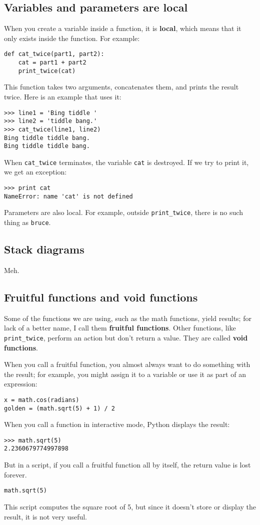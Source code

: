 \documentclass{article}
\begin{document}
\subsection{Variables and parameters are local}
When you create a variable inside a function, it is \textbf{local},
which means that it only exists inside the function. For example:
\begin{verbatim}
def cat_twice(part1, part2):
    cat = part1 + part2
    print_twice(cat)
\end{verbatim}
This function takes two arguments, concatenates them, and
prints the result twice. Here is an example that uses it:
\begin{verbatim}
>>> line1 = 'Bing tiddle '
>>> line2 = 'tiddle bang.'
>>> cat_twice(line1, line2)
Bing tiddle tiddle bang.
Bing tiddle tiddle bang.
\end{verbatim}
When \verb|cat_twice| terminates, the variable \verb|cat| is destroyed.
If we try to print it, we get an exception:
\begin{verbatim}
>>> print cat
NameError: name 'cat' is not defined
\end{verbatim}
Parameters are also local. For example, outside \verb|print_twice|,
there is no such thing as \verb|bruce|.

\subsection{Stack diagrams}
Meh.

\subsection{Fruitful functions and void functions}
Some of the functions we are using, such as the math functions, yield
results; for lack of a better name, I call them
\textbf{fruitful functions}.
Other functions, like \verb|print_twice|, perform an action but don’t return
a value. They are called \textbf{void functions}.

When you call a fruitful function, you almost always want to do
something with the result; for example, you might assign it to a
variable or use it as part of an expression:
\begin{verbatim}
x = math.cos(radians)
golden = (math.sqrt(5) + 1) / 2
\end{verbatim}
When you call a function in interactive mode, Python displays the
result:
\begin{verbatim}
>>> math.sqrt(5)
2.2360679774997898
\end{verbatim}
But in a script, if you call a fruitful function all by itself, the
return value is lost forever.
\begin{verbatim}
math.sqrt(5)
\end{verbatim}
This script computes the square root of 5, but since it doesn’t store
or display the result, it is not very useful.
\end{document}
